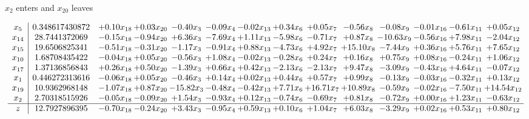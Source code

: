 \documentclass[8pt]{article}
\begin{document}
 $ x_{2} $ enters and $ x_{20} $ leaves 

 \[\begin{array}{c| c c@{\hskip 2pt} c@{\hskip 2pt} c@{\hskip 2pt} c@{\hskip 2pt} c@{\hskip 2pt} c@{\hskip 2pt} c@{\hskip 2pt} c@{\hskip 2pt} c@{\hskip 2pt} c@{\hskip 2pt} c@{\hskip 2pt} c@{\hskip 2pt} }
 x_{5}   &  0.348617430872 & +  0.10 x_{18} & +  0.03 x_{20} & -0.40 x_{3} & -0.09 x_{4} & -0.02 x_{13} & +  0.34 x_{6} & +  0.05 x_{7} & -0.56 x_{8} & -0.08 x_{9} & -0.01 x_{16} & -0.61 x_{11} & +  0.05 x_{12}\\
 x_{14}   &  28.7441372069 & -0.15 x_{18} & -0.94 x_{20} & +  6.36 x_{3} & -7.69 x_{4} & +  1.11 x_{13} & -5.98 x_{6} & -0.71 x_{7} & +  0.87 x_{8} & -10.63 x_{9} & -0.56 x_{16} & +  7.98 x_{11} & -2.04 x_{12}\\
 x_{15}   &  19.6506825341 & -0.51 x_{18} & -0.31 x_{20} & -1.17 x_{3} & -0.91 x_{4} & +  0.88 x_{13} & -4.73 x_{6} & +  4.92 x_{7} & + 15.10 x_{8} & -7.44 x_{9} & +  0.36 x_{16} & +  5.76 x_{11} & +  7.65 x_{12}\\
 x_{10}   &  1.68708435422 & -0.04 x_{18} & +  0.05 x_{20} & -0.56 x_{3} & +  1.08 x_{4} & -0.02 x_{13} & -0.28 x_{6} & +  0.24 x_{7} & +  0.16 x_{8} & +  0.75 x_{9} & +  0.08 x_{16} & -0.24 x_{11} & +  1.06 x_{12}\\
 x_{17}   &  1.37136856843 & +  0.26 x_{18} & +  0.50 x_{20} & -1.39 x_{3} & +  0.66 x_{4} & +  0.42 x_{13} & -2.13 x_{6} & -2.13 x_{7} & +  9.47 x_{8} & -3.09 x_{9} & -0.43 x_{16} & +  4.64 x_{11} & -0.07 x_{12}\\
 x_{1}   &  0.446272313616 & -0.06 x_{18} & +  0.05 x_{20} & -0.46 x_{3} & +  0.14 x_{4} & +  0.02 x_{13} & +  0.44 x_{6} & +  0.57 x_{7} & +  0.99 x_{8} & -0.13 x_{9} & -0.03 x_{16} & -0.32 x_{11} & +  0.13 x_{12}\\
 x_{19}   &  10.9362968148 & -1.07 x_{18} & +  0.87 x_{20} & -15.82 x_{3} & -0.48 x_{4} & -0.42 x_{13} & +  7.71 x_{6} & + 16.71 x_{7} & + 10.89 x_{8} & -0.59 x_{9} & -0.02 x_{16} & -7.50 x_{11} & + 14.54 x_{12}\\
 x_{2}   &  2.70318515926 & -0.05 x_{18} & -0.09 x_{20} & +  1.54 x_{3} & -0.93 x_{4} & +  0.12 x_{13} & -0.74 x_{6} & -0.69 x_{7} & +  0.81 x_{8} & -0.72 x_{9} & +  0.00 x_{16} & +  1.23 x_{11} & -0.63 x_{12}\\
\hline
z    &  12.7927896395 & -0.70 x_{18} & -0.24 x_{20} & +  3.43 x_{3} & -0.95 x_{4} & +  0.59 x_{13} & +  0.10 x_{6} & +  1.04 x_{7} & +  6.03 x_{8} & -3.29 x_{9} & +  0.02 x_{16} & +  0.53 x_{11} & +  0.80 x_{12}\\
\end{array}\]
\end{document}

